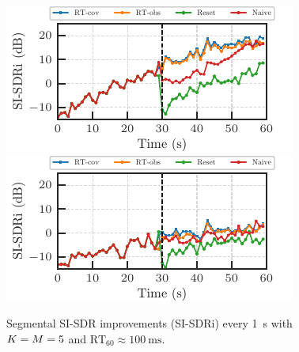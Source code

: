 \documentclass[sip,biber]{now-journal}
\begin{document}
\begin{figure}[t]
\begin{minipage}[t]{.5\linewidth}
    \centering\includegraphics{figures/plots/online/Gauss_8000_fft4096_98.pdf}\label{fig:plot:gauss:98}
    \centering\includegraphics{figures/plots/online/Gauss_8000_fft4096_99.pdf}\label{fig:plot:gauss:99}
  \end{minipage}
  \caption{Segmental SI-SDR improvements (SI-SDRi) every \SI{1}{\second} with $K = M = 5$ and $\text{RT}_{60} \approx \SI{100}{\milli\second}$.}
\end{figure}
\end{document}
